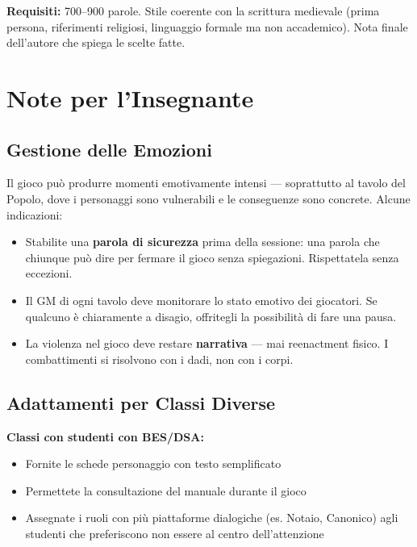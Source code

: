 \textbf{Requisiti:} 700--900 parole. Stile coerente con la
scrittura medievale (prima persona, riferimenti religiosi,
linguaggio formale ma non accademico). Nota finale dell'autore
che spiega le scelte fatte.

\secsep

\section{Note per l'Insegnante}

\subsection{Gestione delle Emozioni}

Il gioco può produrre momenti emotivamente intensi — soprattutto
al tavolo del Popolo, dove i personaggi sono vulnerabili e le
conseguenze sono concrete. Alcune indicazioni:

\begin{itemize}
  \item Stabilite una \textbf{parola di sicurezza} prima della
    sessione: una parola che chiunque può dire per fermare
    il gioco senza spiegazioni. Rispettatela senza eccezioni.
  \item Il GM di ogni tavolo deve monitorare lo stato emotivo
    dei giocatori. Se qualcuno è chiaramente a disagio,
    offritegli la possibilità di fare una pausa.
  \item La violenza nel gioco deve restare \textbf{narrativa}
    — mai reenactment fisico. I combattimenti si risolvono
    con i dadi, non con i corpi.
\end{itemize}

\subsection{Adattamenti per Classi Diverse}

\textbf{Classi con studenti con BES/DSA:}
\begin{itemize}[nosep]
  \item Fornite le schede personaggio con testo semplificato
  \item Permettete la consultazione del manuale durante il gioco
  \item Assegnate i ruoli con più piattaforme dialogiche
    (es. Notaio, Canonico) agli studenti che preferiscono
    non essere al centro dell'attenzione
\end{itemize}

